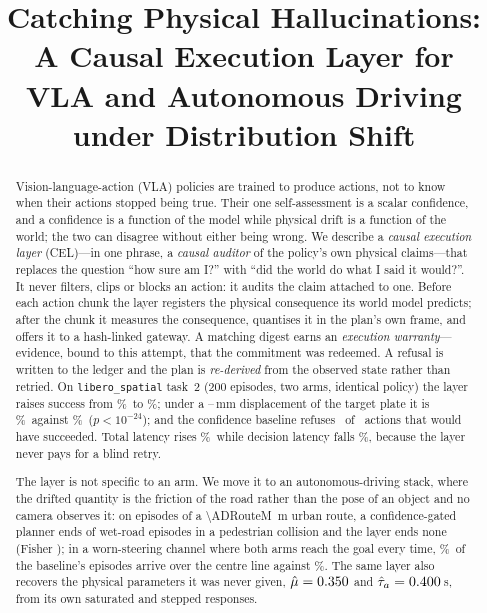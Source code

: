 \documentclass[conference]{IEEEtran}
\theoremstyle{definition}
\newcommand{\lib}{\texttt{libero\_spatial}}
\begin{document}
\title{Catching Physical Hallucinations: A Causal Execution Layer for\\
VLA and Autonomous Driving under Distribution Shift}

\author{%
}

\maketitle

\begin{abstract}
Vision-language-action (VLA) policies are trained to produce actions, not to
know when their actions stopped being true. Their one self-assessment is a
scalar confidence, and a confidence is a function of the model while physical
drift is a function of the world; the two can disagree without either being
wrong. We describe a \emph{causal execution layer} (CEL)---in one phrase, a
\emph{causal auditor} of the policy's own physical claims---that replaces the
question ``how sure am I?'' with ``did the world do what I said it would?''. It
never filters, clips or blocks an action: it audits the claim attached to one.
Before each action chunk the layer registers the physical consequence its world
model predicts; after the chunk it measures the consequence, quantises it in the
plan's own frame, and offers it to a hash-linked gateway. A matching digest earns
an \emph{execution warranty}---evidence, bound to this attempt, that the
commitment was redeemed. A refusal is written to the ledger and the plan is
\emph{re-derived} from the observed state rather than retried. On \lib{} task~2
(200 episodes, two arms, identical policy) the layer raises success from
\SafeAll\%\ to \CELAll\%; under a \PoseDeltaMin--\PoseDeltaMax\,mm displacement of the target plate it is
\CELPoseDrift\%\ against \SafePoseDrift\%\ ($p<10^{-24}$); and the confidence
baseline refuses \SafeFalseVetoes\ of \SafeVetoes\ actions that would have
succeeded. Total latency rises \LatencyDeltaPct\%\ while decision latency falls
\DecisionSavingPct\%, because the layer never pays for a blind retry.

The layer is not specific to an arm. We move it to an autonomous-driving stack,
where the drifted quantity is the friction of the road rather than the pose of
an object and no camera observes it: on \ADEpisodesPerArm{} episodes of a
\SI{\ADRouteM}{m} urban route, a confidence-gated planner ends \ADWetCollSafe{}
of \ADWetN{} wet-road episodes in a pedestrian collision and the layer ends
none (Fisher \ADWetCollP); in a worn-steering channel where both arms reach the
goal every time, \ADLagPaintSafe\%\ of the baseline's episodes arrive over the
centre line against \ADLagPaintCEL\%. The same layer also recovers the physical
parameters it was never given, $\hat\mu=0.350$ and
$\hat\tau_a=0.400$\,s, from its own saturated and stepped responses.


\end{abstract}
\end{document}
